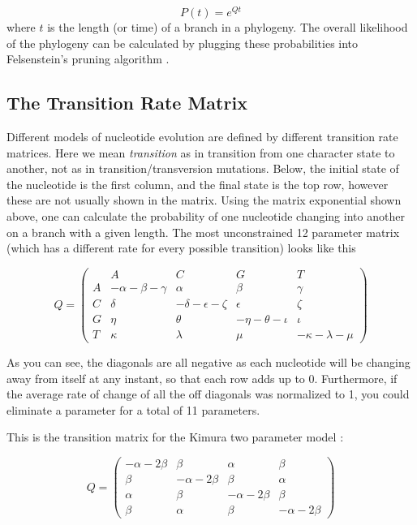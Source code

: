 \documentclass[11pt]{article}
\begin{document}
\begin{equation*}
P(t) = e^{Qt}
\end{equation*}
where $t$ is the length (or time) of a branch in a phylogeny. The overall likelihood of the
phylogeny can be calculated by plugging these probabilities into Felsenstein's pruning algorithm \citep{felsenstein1981evolutionary}.

\subsection{The Transition Rate Matrix}

Different models of nucleotide evolution are defined by different transition rate matrices. 
Here we mean \textit{transition} as in transition from one character state to another, not as in transition/transversion mutations.  
Below, the initial state of the nucleotide is the first column, and the final state is the top row, however these are not usually shown in the matrix.
Using the matrix exponential shown above, one can calculate the probability of one nucleotide changing into another on a branch with a given length.  
The most unconstrained 12 parameter matrix (which has a different rate for every possible transition) looks like this


\[ Q = \left( \begin{array}{ccccc}
  & A & C & G & T \\
A &  - \alpha - \beta - \gamma  &  \alpha  &  \beta  &  \gamma  \\ 
C &  \delta  &  - \delta - \epsilon - \zeta  &  \epsilon  &  \zeta  \\ 
G &  \eta  &  \theta  &  - \eta - \theta - \iota  &  \iota  \\ 
T &  \kappa  &  \lambda  &  \mu  &  - \kappa - \lambda - \mu  
\end{array} \right)\]

\noindent
As you can see, the diagonals are all negative as each nucleotide will be changing away from itself at any instant, so that each row adds up to 0.  
Furthermore, if the average rate of change of all the off diagonals was normalized to 1, you could eliminate a parameter for a total of 11 parameters.

This is the transition matrix for the Kimura two parameter model \citep{kimura1980simple}:

\[ Q = \left( \begin{array}{cccc}
- \alpha - 2 \beta  &  \beta  &  \alpha  &  \beta  \\ 
\beta  &  - \alpha - 2 \beta  &  \beta  &  \alpha  \\ 
\alpha  &  \beta  &  - \alpha - 2 \beta  &  \beta  \\ 
\beta  &  \alpha  &  \beta  &  - \alpha - 2 \beta   
\end{array} \right)\]
\end{document}

